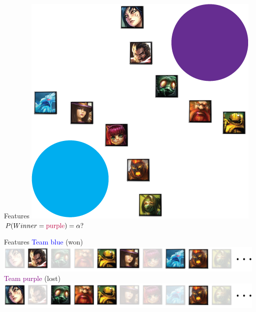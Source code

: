 \begin{frame}{Features}
\centering
\includegraphics[scale=0.35]{img/kent/2.png}\\
\vspace{8pt}
$P(Winner = \textcolor{purple}{\text{purple}}) = \alpha ?$
\end{frame}

\begin{frame}{Features}
\centering
\textcolor{blue}{Team blue} (won)
\includegraphics[scale=0.4]{img/kent/pickblue.png}\\
\vspace{20pt}
\textcolor{purple}{Team purple} (lost)
\includegraphics[scale=0.4]{img/kent/pickpurple.png}\\
\end{frame}

